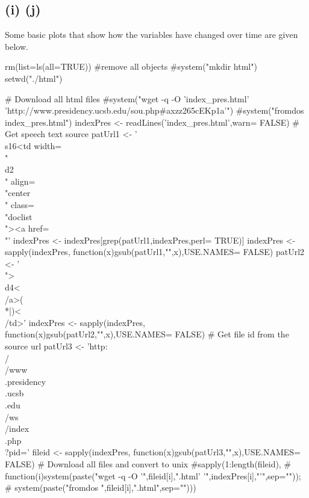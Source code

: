 \documentclass{article}
\begin{document}


\subsection*{(i) (j)}

Some basic plots that show how the variables have changed over time are given below.

rm(list=ls(all=TRUE)) #remove all objects
#system("mkdir html")
setwd("./html")

# Download all html files
#system("wget -q -O 'index_pres.html' 'http://www.presidency.ucsb.edu/sou.php#axzz265cEKp1a'")
#system("fromdos index_pres.html")
indexPres <- readLines('index_pres.html',warn= FALSE)
# Get speech text source
patUrl1 <- '\\s{16}<td width=\\"\\d{2}\\" align=\\"center\\" class=\\"doclist\\"><a href=\\"'
indexPres <- indexPres[grep(patUrl1,indexPres,perl= TRUE)]
indexPres <- sapply(indexPres, function(x){gsub(patUrl1,"",x)},USE.NAMES= FALSE)
patUrl2 <- '\\">\\d{4}<\\/a>(\\*|)<\\/td>'
indexPres <- sapply(indexPres, function(x){gsub(patUrl2,"",x)},USE.NAMES= FALSE)
# Get file id from the source url
patUrl3 <- 'http:\\/\\/www\\.presidency\\.ucsb\\.edu\\/ws\\/index\\.php\\?pid='
fileid <- sapply(indexPres, function(x){gsub(patUrl3,"",x)},USE.NAMES= FALSE)
# Download all files and convert to unix
#sapply(1:length(fileid),
#       function(i){system(paste("wget -q -O '",fileid[i],".html' '",indexPres[i],"'",sep=""));
#                   system(paste("fromdos ",fileid[i],".html",sep=""))})
\end{document}
